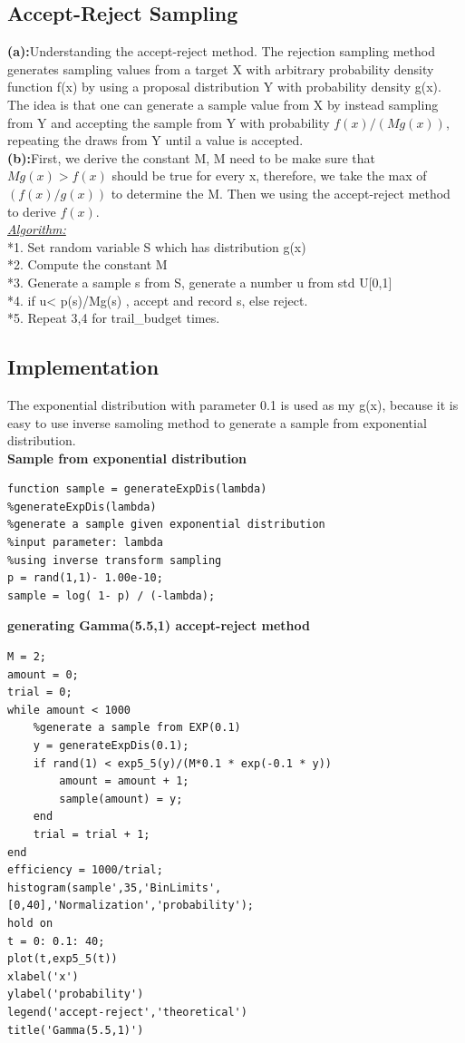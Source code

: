 \documentclass[twoside]{article}
\begin{document}
\begin{multicols*}{2}
\subsection{\normalsize{Accept-Reject Sampling}}
\noindent \textbf {(a):}Understanding the accept-reject method. The rejection sampling method generates sampling values from a target X with arbitrary probability density function f(x) by using a proposal distribution Y with probability density g(x). The idea is that one can generate a sample value from X by instead sampling from Y and accepting the sample from Y with probability ${\displaystyle f(x)/(Mg(x))}$, repeating the draws from Y until a value is accepted. \\
\noindent \textbf {(b):}First, we derive the constant M, M need to be make sure that $Mg(x) > f(x)$ should be true for every x, therefore, we take the max of $(f(x)/g(x))$ to determine the M. Then we using the accept-reject method to derive $f(x)$.\\
\underline{\emph{Algorithm:}}\\[10pt]
*1. Set random variable S which has distribution g(x)\\
*2. Compute the constant M\\
*3. Generate a sample s from S, generate a number u from std U[0,1]\\
*4. if u< p(s)/Mg(s) , accept and record s, else reject.\\
*5. Repeat 3,4 for trail\_budget times.\\

\subsection{\normalsize{Implementation}}
The exponential distribution with parameter 0.1 is used as my g(x), because it is easy to use inverse samoling method to generate a sample from exponential distribution.\\
\noindent \textbf {Sample from exponential distribution}\\
\begin{lstlisting}
function sample = generateExpDis(lambda)
%generateExpDis(lambda)
%generate a sample given exponential distribution
%input parameter: lambda
%using inverse transform sampling
p = rand(1,1)- 1.00e-10;
sample = log( 1- p) / (-lambda);
\end{lstlisting}
\noindent \textbf {generating Gamma(5.5,1) accept-reject method}\\
\begin{lstlisting}
M = 2;
amount = 0;
trial = 0;
while amount < 1000
    %generate a sample from EXP(0.1)
    y = generateExpDis(0.1);
    if rand(1) < exp5_5(y)/(M*0.1 * exp(-0.1 * y))
        amount = amount + 1;
        sample(amount) = y;
    end
    trial = trial + 1;
end
efficiency = 1000/trial;
histogram(sample',35,'BinLimits',[0,40],'Normalization','probability');
hold on
t = 0: 0.1: 40;
plot(t,exp5_5(t))
xlabel('x')
ylabel('probability')
legend('accept-reject','theoretical')
title('Gamma(5.5,1)')
\end{lstlisting}


\end{multicols*}
\end{document}
